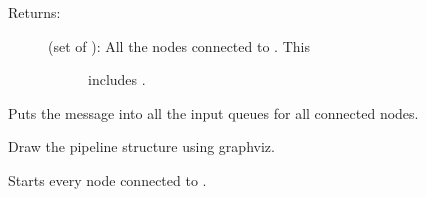 \documentclass[letterpaper,10pt,english]{sphinxmanual}
\begin{document}
\begin{fulllineitems}
\begin{fulllineitems}
\begin{description}
\begin{description}
\end{description}

\item[{Returns:}] \leavevmode\begin{description}
\item[{(set of ): All the nodes connected to . This}] \leavevmode
includes .

\end{description}

\end{description}

\end{fulllineitems}


\begin{fulllineitems}
\label{\detokenize{api:nanostream.node.NanoNode.broadcast}}
Puts the message into all the input queues for all connected nodes.

\end{fulllineitems}


\begin{fulllineitems}
\label{\detokenize{api:nanostream.node.NanoNode.cleanup}}
\end{fulllineitems}


\begin{fulllineitems}
\label{\detokenize{api:nanostream.node.NanoNode.draw_pipeline}}
Draw the pipeline structure using graphviz.

\end{fulllineitems}


\begin{fulllineitems}
\label{\detokenize{api:nanostream.node.NanoNode.global_start}}
Starts every node connected to .


\end{fulllineitems}
\end{fulllineitems}
\end{document}
